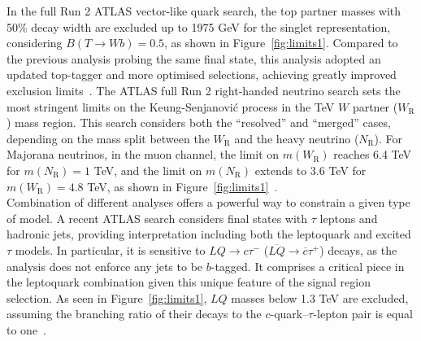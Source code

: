 \documentclass{moriond}
\begin{document}
In the full Run 2 ATLAS vector-like quark search, the top partner masses with
50\% decay width are excluded up to 1975 GeV for the singlet representation,
considering $B(T\rightarrow Wb)=0.5$, as shown in
Figure~\ref{fig:limits1}. Compared to the previous analysis
probing the same final state, this analysis adopted an updated top-tagger and
more optimised selections, achieving greatly improved exclusion limits~\cite{vlq}. The
ATLAS full Run 2 right-handed neutrino search sets the most stringent limits on
the Keung-Senjanović process in the TeV $W$ partner ($W_{\mathrm{R}}$) mass
region. This search considers both the ``resolved'' and ``merged'' cases,
depending on the mass split between the $W_{\mathrm{R}}$ and the heavy neutrino
($N_{\mathrm{R}}$). For Majorana neutrinos, in the muon channel, the limit on
$m(W_{\mathrm{R}})$ reaches 6.4 TeV for $m(N_{\mathrm{R}})=1$ TeV, and the
limit on $m(N_{\mathrm{R}})$ extends to 3.6 TeV for $m(W_{\mathrm{R}})=4.8$
TeV, as shown in Figure~\ref{fig:limits1}~\cite{rhn}.\\           

Combination of different analyses offers a powerful way to constrain a given
type of model. A recent ATLAS search considers final states with $\tau$ leptons
and hadronic jets, providing interpretation including both the leptoquark and
excited $\tau$ models. In particular, it is sensitive to $LQ\rightarrow
c\tau^{-}$ ($\overline{LQ}\rightarrow\overline{c}\tau^{+}$) decays, as the
analysis does not enforce any jets to be $b$-tagged. It comprises a critical
piece in the leptoquark combination given this unique feature of the signal
region selection. As seen in Figure~\ref{fig:limits1},
$LQ$ masses below 1.3 TeV are excluded, assuming the branching ratio of their
decays to the $c$-quark–$\tau$-lepton pair is equal to one~\cite{tau}.\\   

\clearpage
\end{document}
